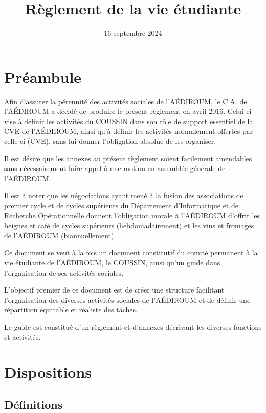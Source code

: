 \documentclass{aediroum}
\title{Règlement de la vie étudiante}
\date{16 septembre 2024}
\begin{document}
\maketitle

\section{Préambule}\label{sec:preambule}

Afin d'assurer la pérennité des activités sociales de l'AÉDIROUM, le C.A. de l'AÉDIROUM a décidé de produire le présent règlement en avril 2016. Celui-ci vise à définir les activités du COUSSIN dans son rôle de support essentiel de la CVE de l'AÉDIROUM, ainsi qu'à définir les activités normalement offertes par celle-ci (CVE), sans lui donner l'obligation absolue de les organiser.

Il est désiré que les annexes au présent règlement soient facilement amendables sans nécessairement faire appel à une motion en assemblée générale de l'AÉDIROUM.

Il est à noter que les négociations ayant mené à la fusion des associations de premier cycle et de cycles supérieurs du Département d'Informatique et de Recherche Opérationnelle donnent l'obligation morale à l'AÉDIROUM d'offrir les beignes et café de cycles supérieurs (hebdomadairement) et les vins et fromages de l'AÉDIROUM (biannuellement).

Ce document se veut à la fois un document constitutif du comité permanent à la vie étudiante de l'AÉDIROUM, le COUSSIN, ainsi qu'un guide dans l'organisation de ses activités sociales.

L'objectif premier de ce document est de créer une structure facilitant l'organisation des diverses activités sociales de l'AÉDIROUM et de définir une répartition équitable et réaliste des tâches.

Le guide est constitué d'un règlement et d'annexes décrivant les diverses fonctions et activités.

\section{Dispositions}\label{sec:dispositions}

\subsection{Définitions}\label{sec:definitions}
\end{document}
